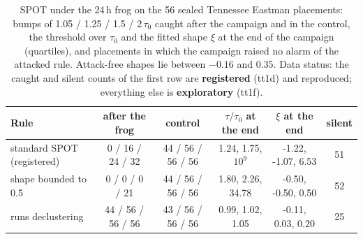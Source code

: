 \documentclass[sigconf,review,anonymous]{acmart}
\begin{document}
\begin{table}[t]
\caption{SPOT under the 24\,h frog on the 56 sealed Tennessee Eastman placements: bumps of 1.05 / 1.25 /
1.5 / 2\,$\tau_0$ caught after the campaign and in the control, the threshold over $\tau_0$ and the fitted
shape $\xi$ at the end of the campaign (quartiles), and placements in which the campaign raised no alarm
of the attacked rule. Attack-free shapes lie between $-0.16$ and $0.35$. Data status: the caught and silent
counts of the first row are \textbf{registered} (tt1d) and reproduced; everything else is \textbf{exploratory}
(tt1f).}
\label{tab:spotfrog}
\small
\begin{tabularx}{\textwidth}{@{}Lccccc@{}}
\toprule
Rule & after the frog & control & $\tau/\tau_0$ at the end & $\xi$ at the end & silent \\
\midrule
standard SPOT (registered) & 0 / 16 / 24 / 32 & 44 / 56 / 56 / 56 & 1.24, 1.75, $10^{9}$ & -1.22, -1.07, 6.53 & 51 \\
shape bounded to 0.5 & 0 / 0 / 0 / 21 & 44 / 56 / 56 / 56 & 1.80, 2.26, 34.78 & -0.50, -0.50, 0.50 & 52 \\
runs declustering & 44 / 56 / 56 / 56 & 43 / 56 / 56 / 56 & 0.99, 1.02, 1.05 & -0.11, 0.03, 0.20 & 25 \\
\bottomrule
\end{tabularx}
\end{table}
\end{document}
